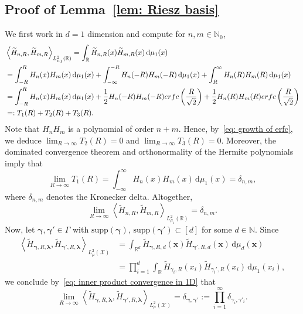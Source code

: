 \documentclass[namedate,webpdf]{ima-authoring-template-blank}
\newcommand*{\supp}{\mathrm{supp}}
\def\D{\,\mathrm{d}}
\newcommand*{\ip}[2]{\left\langle #1, #2 \right\rangle}
\numberwithin{counter}{section}
\numberwithin{equation}{section}
\theoremstyle{plain}
\theoremstyle{definition}
\newcommand*{\cX}{\mathcal{X}}
\newcommand*{\bbN}{\mathbb{N}}
\newcommand*{\bbR}{\mathbb{R}}
\newcommand*{\wtH}{\widetilde{H}}
\theoremstyle{thmstyletwo}
\begin{document}
\subsection{Proof of Lemma~\ref{lem: Riesz basis}}
\label{subsec: app: proof Riesz basis}

We first work in \(d = 1\) dimension and compute for \(n, m \in \bbN_0\),
\begin{align*}
    &\ip{\wtH_{n,R}}{\wtH_{m,R}}_{L_{\mu_1}^2(\bbR)} 
    = \int_{\bbR}\wtH_{n,R}(x) \wtH_{m,R}(x) \D \mu_1(x) \\
    &= \int_{-R}^R H_{n}(x) H_{m}(x) \D \mu_1(x)
    + \int_{-\infty}^{-R} H_n(-R) H_m(-R) \D \mu_1(x) 
    + \int_R^{\infty} H_n(R) H_m(R) \D \mu_1(x) \\
    &= \int_{-R}^R H_{n}(x) H_{m}(x) \D \mu_1(x)
    + \frac{1}{2} H_n(-R) H_m(-R) \textup{erfc}\left(\frac{R}{\sqrt{2}}\right)
    + \frac{1}{2} H_n(R) H_m(R) \textup{erfc}\left(\frac{R}{\sqrt{2}}\right) \\
    &=: T_1(R) + T_2(R) + T_3(R).
\end{align*}
Note that \(H_n H_m\) is a polynomial of order \(n+m\). Hence, by~\eqref{eq: growth of erfc}, we deduce \(\lim_{R \to \infty} T_2(R) = 0\) and \(\lim_{R \to \infty} T_3(R) = 0\). Moreover, the dominated convergence theorem and orthonormality of the Hermite polynomials imply that
\[
\lim_{R \to \infty} T_1(R) = \int_{-\infty}^{\infty} H_n(x) H_m(x) \D \mu_1(x) = \delta_{n,m},
\]
where \( \delta_{n,m} \) denotes the Kronecker delta.
Altogether, 
\begin{equation}
\label{eq: inner product convergence in 1D}
    \lim_{R \to \infty} \ip{\wtH_{n,R}}{\wtH_{m,R}}_{L_{\mu_1}^2(\bbR)} = \delta_{n, m}.
\end{equation}
Now, let \(\bm{\gamma}, \bm{\gamma'} \in \Gamma\) with \(\supp(\bm{\gamma})\), \(\supp(\bm{\gamma'}) \subset [d]\) for some \(d \in \bbN\). Since
\begin{align*}
    \ip{\wtH_{\bm{\gamma}, R, \bm{\lambda}}}{\wtH_{\bm{\gamma'}, R, \bm{\lambda}}}_{L_{\mu}^2(\cX)} 
    &= \int_{\bbR^d} \wtH_{\bm{\gamma}, R, d}(\bm{x}) \wtH_{\bm{\gamma'}, R, d}(\bm{x}) \D \mu_d(\bm{x}) \\
    &= \prod_{i=1}^d \int_{\bbR}\wtH_{\gamma_i, R}(x_i) \wtH_{\gamma_i', R}(x_i) \D \mu_1(x_i),
\end{align*}
we conclude by~\eqref{eq: inner product convergence in 1D} that
\[
\lim_{R \to \infty} \ip{\wtH_{\bm{\gamma}, R, \bm{\lambda}}}{\wtH_{\bm{\gamma'}, R, \bm{\lambda}}}_{L_{\mu}^2(\cX)} 
= \delta_{\bm{\gamma}, \bm{\gamma'}} := \prod_{i = 1}^{\infty} \delta_{\gamma_i, \gamma'_i}.
\]
\end{document}
